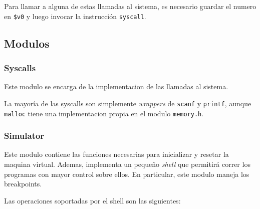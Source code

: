 \documentclass[12pt]{article}
\begin{document}
Para llamar a alguna de estas llamadas al sistema, es necesario guardar el numero en
\texttt{\$v0} y luego invocar la instrucción \texttt{syscall}.


\subsection{Modulos}
\subsubsection{Syscalls}
Este modulo se encarga de la implementacion de las llamadas al sistema.

La mayoría de las syscalls son simplemente \textit{wrappers} de \texttt{scanf} y \texttt{printf}, aunque \texttt{malloc} tiene una implementacion propia en el modulo \texttt{memory.h}. 




\subsubsection{Simulator}

Este modulo contiene las funciones necesarias para inicializar y resetar la maquina virtual. Ademas, implementa un pequeño \textit{shell} que permitirá correr los programas con mayor control sobre ellos. En particular, este modulo maneja los breakpoints. 

Las operaciones soportadas por el shell  son las siguientes:
\end{document}
